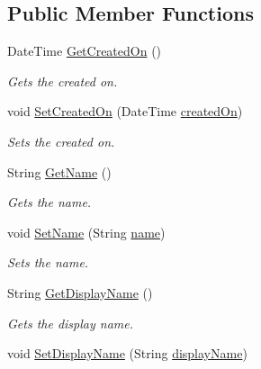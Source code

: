 \subsection*{Public Member Functions}
\begin{DoxyCompactItemize}
\item 
Date\+Time \hyperlink{classcom_1_1shephertz_1_1app42_1_1paas_1_1sdk_1_1csharp_1_1gift_1_1_gift_a7bd5269c08d111eb3d4e36847afc140d}{Get\+Created\+On} ()
\begin{DoxyCompactList}\small\item\em Gets the created on. \end{DoxyCompactList}\item 
void \hyperlink{classcom_1_1shephertz_1_1app42_1_1paas_1_1sdk_1_1csharp_1_1gift_1_1_gift_ac552b2142c7c7237422f7d98a69ff949}{Set\+Created\+On} (Date\+Time \hyperlink{classcom_1_1shephertz_1_1app42_1_1paas_1_1sdk_1_1csharp_1_1gift_1_1_gift_a86191b80a09d2d07ddefad69aefb21eb}{created\+On})
\begin{DoxyCompactList}\small\item\em Sets the created on. \end{DoxyCompactList}\item 
String \hyperlink{classcom_1_1shephertz_1_1app42_1_1paas_1_1sdk_1_1csharp_1_1gift_1_1_gift_aadc9beb6c991a8a286a76d67306cbe76}{Get\+Name} ()
\begin{DoxyCompactList}\small\item\em Gets the name. \end{DoxyCompactList}\item 
void \hyperlink{classcom_1_1shephertz_1_1app42_1_1paas_1_1sdk_1_1csharp_1_1gift_1_1_gift_ab54ee7229614820985b9ae07c190f2f8}{Set\+Name} (String \hyperlink{classcom_1_1shephertz_1_1app42_1_1paas_1_1sdk_1_1csharp_1_1gift_1_1_gift_ae4132aedea027842f094bd185626b949}{name})
\begin{DoxyCompactList}\small\item\em Sets the name. \end{DoxyCompactList}\item 
String \hyperlink{classcom_1_1shephertz_1_1app42_1_1paas_1_1sdk_1_1csharp_1_1gift_1_1_gift_abce9bd7752614bf475ba3b0e5b38f76e}{Get\+Display\+Name} ()
\begin{DoxyCompactList}\small\item\em Gets the display name. \end{DoxyCompactList}\item 
void \hyperlink{classcom_1_1shephertz_1_1app42_1_1paas_1_1sdk_1_1csharp_1_1gift_1_1_gift_a2417bbecee8be0ff81e5a8b5fc9e0a5f}{Set\+Display\+Name} (String \hyperlink{classcom_1_1shephertz_1_1app42_1_1paas_1_1sdk_1_1csharp_1_1gift_1_1_gift_a58ec6179bf665e288fb23d2f5f569ac5}{display\+Name})

\end{DoxyCompactItemize}
